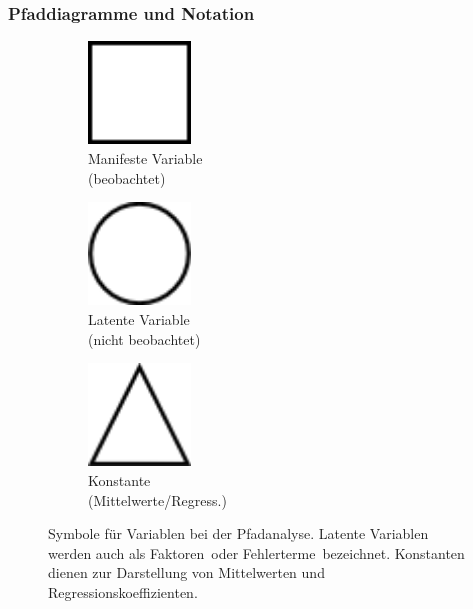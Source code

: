 \documentclass{article}
\numberwithin{equation}{section}
\begin{document}
\subsubsection{Pfaddiagramme und Notation}

\begin{figure}[h]
  \centering
  \captionsetup{justification=centering}
  \begin{subfigure}[b]{0.3\textwidth}
    \centering
    \includegraphics[width=0.3\textwidth]{images/pfad-symbole/manifest.png}
    \caption{Manifeste Variable\\ (beobachtet)}
  \end{subfigure}
  \begin{subfigure}[b]{0.3\textwidth}
    \centering
    \includegraphics[width=0.3\textwidth]{images/pfad-symbole/latent.png}
    \caption{Latente Variable\\ (nicht beobachtet)}
  \end{subfigure}
  \begin{subfigure}[b]{0.3\textwidth}
    \centering
    \includegraphics[width=0.3\textwidth]{images/pfad-symbole/konstant.png}
    \caption{Konstante\\ (Mittelwerte/Regress.)}
  \end{subfigure}
  \caption{Symbole für Variablen bei der Pfadanalyse. Latente Variablen werden auch als \glqq Faktoren\grqq\ oder \glqq Fehlerterme\grqq\ bezeichnet. Konstanten dienen zur Darstellung von Mittelwerten und Regressionskoeffizienten.}
  \label{img:pfad-symbole}
\end{figure}
\end{document}
